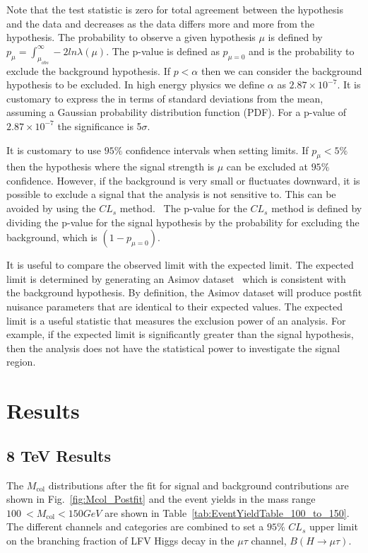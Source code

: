 \documentclass[oneside, letterpaper, oldfontcommands]{memoir}
\begin{document}
{{{\qquad Note that the test statistic is zero for total agreement between the hypothesis and the data and decreases as the data differs more and more from the hypothesis. The probability to observe a given hypothesis $\mu$ is defined by $p_{\mu} = \int_{\mu_{obs}}^{\infty} - 2 ln \lambda(\mu)$. The p-value is defined as $p_{\mu=0}$ and is the probability to exclude the background hypothesis. If $p<\alpha$ then we can consider the background hypothesis to be excluded. In high energy physics we define $\alpha$ as $2.87 \times 10^{-7}$. It is customary to express the in terms of standard deviations from the mean, assuming a Gaussian probability distribution function (PDF). For a p-value of $2.87 \times 10^{-7}$ the significance is 5$\sigma$. 

\qquad It is customary to use $95\%$ confidence intervals when setting limits. If $p_{\mu} < 5\%$ then the hypothesis where the signal strength is $\mu$ can be excluded at $95\%$ confidence. However, if the background is very small or fluctuates downward, it is possible to exclude a signal that the analysis is not sensitive to. This can be avoided by using the $CL_{s}$ method.~\cite{Read:451614} The p-value for the $CL_{s}$ method is defined by dividing the p-value for the signal hypothesis by the probability for excluding the background, which is $(1-p_{\mu=0})$.

\qquad It is useful to compare the observed limit with the expected limit. The expected limit is determined by generating an Asimov dataset~\cite{Cowan:2010js} which is consistent with the background hypothesis. By definition, the Asimov dataset will produce postfit nuisance parameters that are identical to their expected values. The expected limit is a useful statistic that measures the exclusion power of an analysis. For example, if the expected limit is significantly greater than the signal hypothesis, then the analysis does not have the statistical power to investigate the signal region. 
\section{Results}
\subsection{8 TeV Results}
The $M_\text{col}$ distributions after the fit for signal and background contributions are shown in Fig.~\ref{fig:Mcol_Postfit} and the
event yields in the mass range $100\:  < M_\text{col} < 150GeV$ are shown in Table~\ref{tab:EventYieldTable_100_to_150}.
The different channels and categories are combined  to set a $95\%$ $CL_{s}$  upper limit on the branching
fraction of LFV Higgs decay in the  $\mu \tau$ channel, $B(H\rightarrow\mu\tau)$.

}}}
\end{document}

